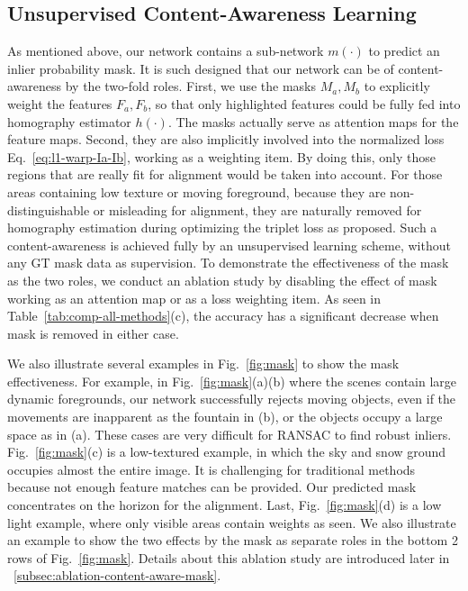 \documentclass[runningheads]{llncs}
\begin{document}
\subsection{Unsupervised Content-Awareness Learning}\label{subsec:unsupervised-content-awareness-learning}As mentioned above, our network contains a sub-network $m(\cdot)$ to predict an inlier probability mask. It is such designed that our network can be of content-awareness by the two-fold roles. First, we use the masks $M_a, M_b$ to explicitly weight the features $F_a, F_b$, so that only highlighted features could be fully fed into homography estimator $h(\cdot)$. The masks actually serve as attention maps for the feature maps. Second, they are also implicitly involved into the normalized loss Eq.~\ref{eq:l1-warp-Ia-Ib}, working as a weighting item.
By doing this, only those regions that are really fit for alignment would be taken into account. For those areas containing low texture or moving foreground, because they are non-distinguishable or misleading for alignment, they are naturally removed for homography estimation during optimizing the triplet loss as proposed. Such a content-awareness is achieved fully by an unsupervised learning scheme, without any GT mask data as supervision. To demonstrate the effectiveness of the mask as the two roles, we conduct an ablation study by disabling the effect of mask working as an attention map or as a loss weighting item. As seen in Table~\ref{tab:comp-all-methods}(c), the accuracy has a significant decrease when mask is removed in either case.

We also illustrate several examples in Fig.~\ref{fig:mask} to show the mask effectiveness. For example, in {\color{black}Fig.~\ref{fig:mask}(a)(b) where the scenes contain large dynamic foregrounds, our network successfully rejects moving objects, even if the movements are inapparent as the fountain in (b), or the objects occupy a large space as in (a).} These cases are very difficult for RANSAC to find robust inliers. {\color{black}Fig.~\ref{fig:mask}(c) is a low-textured example, in which the sky and snow ground occupies almost the entire image. It is challenging for traditional methods because not enough feature matches can be provided. Our predicted mask concentrates on the horizon for the alignment.} Last, Fig.~\ref{fig:mask}(d) is a low light example, where only visible areas contain weights as seen. We also illustrate an example to show the two effects by the mask as separate roles in the bottom 2 rows of Fig.~\ref{fig:mask}. Details about this ablation study are introduced later in \secname~\ref{subsec:ablation-content-aware-mask}. 
\end{document}
